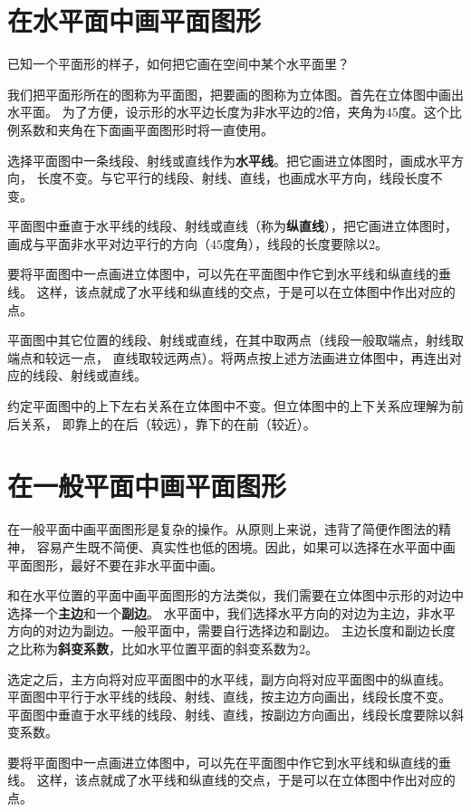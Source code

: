 \documentclass[12pt,UTF8]{ctexbook}
\begin{document}
\begin{appendix}
\section{在水平面中画平面图形}

已知一个平面形的样子，如何把它画在空间中某个水平面里？

我们把平面形所在的图称为平面图，把要画的图称为立体图。首先在立体图中画出水平面。
为了方便，设示形的水平边长度为非水平边的$2$倍，夹角为$45$度。这个比例系数和夹角在下面画平面图形时将一直使用。

选择平面图中一条线段、射线或直线作为\textbf{水平线}。把它画进立体图时，画成水平方向，
长度不变。与它平行的线段、射线、直线，也画成水平方向，线段长度不变。

平面图中垂直于水平线的线段、射线或直线（称为\textbf{纵直线}），把它画进立体图时，
画成与平面非水平对边平行的方向（$45$度角），线段的长度要除以$2$。

要将平面图中一点画进立体图中，可以先在平面图中作它到水平线和纵直线的垂线。
这样，该点就成了水平线和纵直线的交点，于是可以在立体图中作出对应的点。

平面图中其它位置的线段、射线或直线，在其中取两点（线段一般取端点，射线取端点和较远一点，
直线取较远两点）。将两点按上述方法画进立体图中，再连出对应的线段、射线或直线。

约定平面图中的上下左右关系在立体图中不变。但立体图中的上下关系应理解为前后关系，
即靠上的在后（较远），靠下的在前（较近）。

\section{在一般平面中画平面图形}

在一般平面中画平面图形是复杂的操作。从原则上来说，违背了简便作图法的精神，
容易产生既不简便、真实性也低的困境。因此，如果可以选择在水平面中画平面图形，最好不要在非水平面中画。

和在水平位置的平面中画平面图形的方法类似，我们需要在立体图中示形的对边中选择一个\textbf{主边}和一个\textbf{副边}。
水平面中，我们选择水平方向的对边为主边，非水平方向的对边为副边。一般平面中，需要自行选择边和副边。
主边长度和副边长度之比称为\textbf{斜变系数}，比如水平位置平面的斜变系数为$2$。

选定之后，主方向将对应平面图中的水平线，副方向将对应平面图中的纵直线。
平面图中平行于水平线的线段、射线、直线，按主边方向画出，线段长度不变。
平面图中垂直于水平线的线段、射线、直线，按副边方向画出，线段长度要除以斜变系数。

要将平面图中一点画进立体图中，可以先在平面图中作它到水平线和纵直线的垂线。
这样，该点就成了水平线和纵直线的交点，于是可以在立体图中作出对应的点。


\end{appendix}
\end{document}
